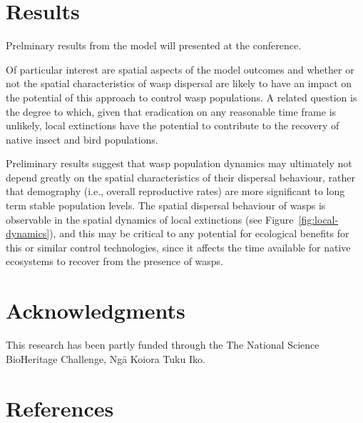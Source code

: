 \documentclass[11pt]{article}
\begin{document}
\section{Results}\label{sec:results}
Prelminary results from the model will presented at the conference.
\par
Of particular interest are spatial aspects of the model outcomes and whether or not the spatial characteristics of wasp dispersal are likely to have an impact on the potential of this approach to control wasp populations.
A related question is the degree to which, given that eradication on any reasonable time frame is unlikely, local extinctions have the potential to contribute to the recovery of native insect and bird populations.
\par
Preliminary results suggest that wasp population dynamics may ultimately not depend greatly on the spatial characteristics of their dispersal behaviour, rather that demography (i.e., overall reproductive rates) are more significant to long term stable population levels.
The spatial dispersal behaviour of wasps is observable in the spatial dynamics of local extinctions (see Figure~\ref{fig:local-dynamics}), and this may be critical to any potential for ecological benefits for this or similar control technologies, since it affects the time available for native ecosystems to recover from the presence of wasps.
\par
%
%
\section{Acknowledgments}\label{sec:acknowledgments}
This research has been partly funded through the The National Science BioHeritage Challenge, Ngā Koiora Tuku Iko.
%


\section{References}

\end{document}
